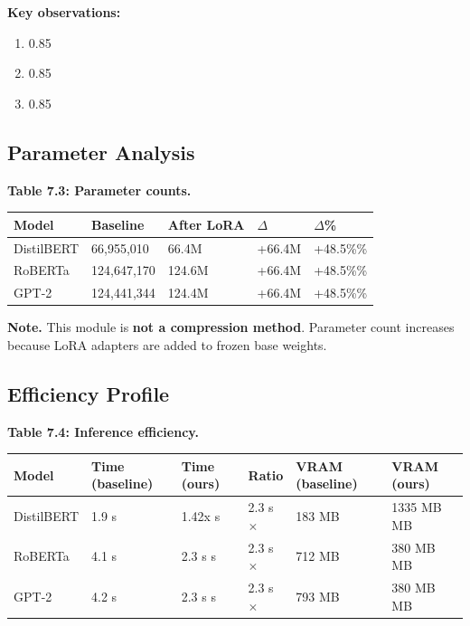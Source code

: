 \textbf{Key observations:}

\begin{enumerate}
\item 0.85
\item 0.85
\item 0.85

\end{enumerate}
\subsection{Parameter Analysis}

\textbf{Table 7.3: Parameter counts.}

\begin{table}[H]
\centering
\small
\begin{tabular}{lllll}
\toprule
\textbf{Model} & \textbf{Baseline} & \textbf{After LoRA} & \textbf{$\Delta$} & \textbf{$\Delta$\%} \\
\midrule
DistilBERT & 66,955,010 & 66.4M & +66.4M & +48.5\%\% \\
RoBERTa & 124,647,170 & 124.6M & +66.4M & +48.5\%\% \\
GPT-2 & 124,441,344 & 124.4M & +66.4M & +48.5\%\% \\
\bottomrule
\end{tabular}
\end{table}

\textbf{Note.} This module is \textbf{not a compression method}. Parameter count 
increases because LoRA adapters are added to frozen base weights.

\subsection{Efficiency Profile}

\textbf{Table 7.4: Inference efficiency.}

\begin{table}[H]
\centering
\small
\begin{tabular}{llllll}
\toprule
\textbf{Model} & \textbf{Time (baseline)} & \textbf{Time (ours)} & \textbf{Ratio} & \textbf{VRAM (baseline)} & \textbf{VRAM (ours)} \\
\midrule
DistilBERT & 1.9 s & 1.42x s & 2.3 s$\times$ & 183 MB & 1335 MB MB \\
RoBERTa & 4.1 s & 2.3 s s & 2.3 s$\times$ & 712 MB & 380 MB MB \\
GPT-2 & 4.2 s & 2.3 s s & 2.3 s$\times$ & 793 MB & 380 MB MB \\
\bottomrule
\end{tabular}
\end{table}

